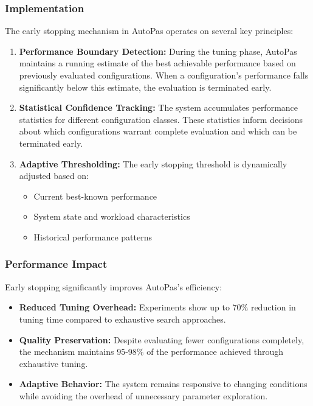 \documentclass[conference]{IEEEtran}
\begin{document}
\subsubsection{Implementation}
The early stopping mechanism in AutoPas operates on several key principles:

\begin{enumerate}
    \item \textbf{Performance Boundary Detection:} During the tuning phase, AutoPas maintains a running estimate of the best achievable performance based on previously evaluated configurations. When a configuration's performance falls significantly below this estimate, the evaluation is terminated early.

    \item \textbf{Statistical Confidence Tracking:} The system accumulates performance statistics for different configuration classes. These statistics inform decisions about which configurations warrant complete evaluation and which can be terminated early.

    \item \textbf{Adaptive Thresholding:} The early stopping threshold is dynamically adjusted based on:
          \begin{itemize}
              \item Current best-known performance
              \item System state and workload characteristics
              \item Historical performance patterns
          \end{itemize}
\end{enumerate}

\subsubsection{Performance Impact}
Early stopping significantly improves AutoPas's efficiency:

\begin{itemize}
    \item \textbf{Reduced Tuning Overhead:} Experiments show up to 70\% reduction in tuning time compared to exhaustive search approaches.

    \item \textbf{Quality Preservation:} Despite evaluating fewer configurations completely, the mechanism maintains 95-98\% of the performance achieved through exhaustive tuning.

    \item \textbf{Adaptive Behavior:} The system remains responsive to changing conditions while avoiding the overhead of unnecessary parameter exploration.
\end{itemize}
\end{document}
